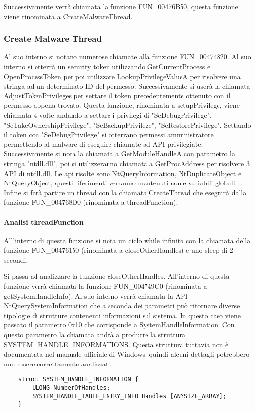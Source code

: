 \documentclass[a4paper,12pt]{article}
\begin{document}
Successivamente verrà chiamata la funzione FUN\_00476B50, questa funzione viene rinominata a CreateMalwareThread. 

\subsubsection{Create Malware Thread}
Al suo interno si notano numerose chiamate alla funzione FUN\_00474820. Al suo interno si otterrà un security token utilizzando GetCurrentProcess e OpenProcessToken per poi utilizzare LookupPrivilegeValueA per risolvere una stringa ad un determinato ID del permesso. Successivamente si userà la chiamata AdjustTokenPrivileges per settare il token precedentemente ottenuto con il permesso appena trovato. Questa funzione, rinominata a setupPrivilege, viene chiamata 4 volte andando a settare i privilegi di "SeDebugPrivilege", "SeTakeOwnershipPrivilege", "SeBackupPrivilege", "SeRestorePrivilege".  Settando il token con "SeDebugPrivilege" si otterrano permessi amministratore permettendo al malware di eseguire chiamate ad API privilegiate.  
Successivamente si nota la chiamata a GetModuleHandleA con parametro la stringa "ntdll.dll", poi si utilizzeranno chiamata a GetProcAddress per risolvere 3 API di ntdll.dll. Le api risolte sono NtQueryInformation, NtDuplicateObject e NtQueryObject, questi riferimenti verranno mantenuti come variabili globali. Infine si farà partire un thread con la chiamata CreateThread che eseguirà dalla funzione FUN\_004768D0 (rinominata a threadFunction).

\paragraph{Analisi threadFunction}
All'interno di questa funzione si nota un ciclo while infinito con la chiamata della funzione FUN\_00476150 (rinominata a closeOtherHandles) e uno sleep di 2 secondi.

Si passa ad analizzare la funzione closeOtherHandles. All'interno di questa funzione verrà chiamata la funzione FUN\_004749C0 (rinominata a getSystemHandleInfo). Al suo interno verrà chiamata la API NtQuerySystemInformation che a seconda dei parametri può ritornare diverse tipologie di strutture contenenti informazioni sul sistema. In questo caso viene passato il parametro 0x10 che corrisponde a SystemHandleInformation. Con questo parametro la chiamata andrà a produrre la struttura \\SYSTEM\_HANDLE\_INFORMATIONS. Questa struttura tuttavia non è documentata nel manuale ufficiale di Windows, quindi alcuni dettagli potrebbero non essere correttamente analizzati.
\begin{verbatim}
	struct SYSTEM_HANDLE_INFORMATION {
		ULONG NumberOfHandles;
		SYSTEM_HANDLE_TABLE_ENTRY_INFO Handles [ANYSIZE_ARRAY];
	}
\end{verbatim}
\end{document}
